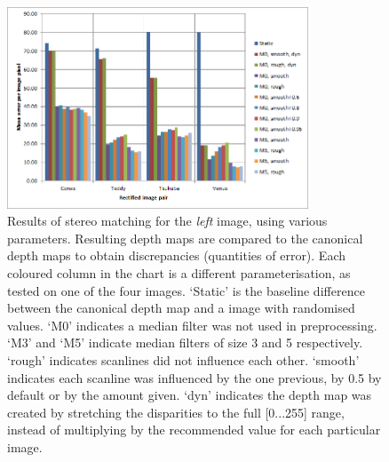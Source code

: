 \begin{figure}[h]
  \centering
  \includegraphics[width=0.8\textwidth]{Stereo-left-report}
  \caption[Results of stereo matching (left image)]{Results of stereo
    matching for the \emph{left} image, using various parameters. Resulting
    depth maps are compared to the canonical depth maps to obtain discrepancies
    (quantities of error). Each coloured column in the chart is a different
    parameterisation, as tested on one of the four images. `Static' is the
    baseline difference between the canonical depth map and a image with
    randomised values. `M0' indicates a median filter was not used in
    preprocessing. `M3' and `M5' indicate median filters of size 3 and 5
    respectively. `rough' indicates scanlines did not influence each other.
    `smooth' indicates each scanline was influenced by the one previous, by 0.5
    by default or by the amount given. `dyn' indicates the depth map was created
    by stretching the disparities to the full [0...255] range, instead of
    multiplying by the recommended value for each particular image.}
  \label{fig:stereo-left}
\end{figure}


